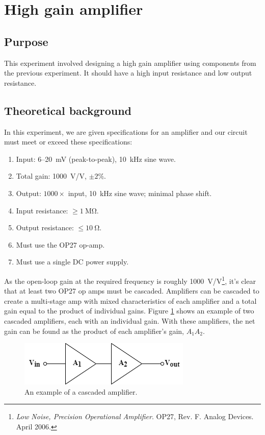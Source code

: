 \documentclass{report}
\begin{document}
	
	\pagebreak
	
	\section{High gain amplifier}
	
	\subsection{Purpose}
	This experiment involved designing a high gain amplifier using components from the previous experiment. It should have a high input resistance and low output resistance.
	
	\subsection{Theoretical background}
	In this experiment, we are given specifications for an amplifier and our circuit must meet or exceed these specifications:
	\begin{enumerate}
		\item Input: \num{6}--\SI{20}{\milli\volt} (peak-to-peak), \SI{10}{\kHz} sine wave.
		\item Total gain: \SI{1000}{\V/\V}, $\pm 2\%$.
		\item Output: $1000 \times $ input, \SI{10}{\kHz} sine wave; minimal phase shift.
		\item Input resistance: $\ge \SI{1}{\Mohm}$.
		\item Output resistance: $\le \SI{10}{\ohm}$.
		\item Must use the OP27 op-amp.
		\item Must use a single DC power supply.
	\end{enumerate}
	As the open-loop gain at the required frequency is roughly \SI{1000}{\V/\V}\footnote{\textit{Low Noise, Precision Operational Amplifier}. OP27, Rev. F. Analog Devices. April 2006.}, it's clear that at least two OP27 op amps must be cascaded. Amplifiers can be cascaded to create a multi-stage amp with mixed characteristics of each amplifier and a total gain equal to the product of individual gains. Figure \ref{fig:cascaded} shows an example of two cascaded amplifiers, each with an individual gain. With these amplifiers, the net gain can be found as the product of each amplifier's gain, $A_1 A_2$.
	\begin{figure}[h]
		\centering
		\includegraphics[width=0.4\linewidth]{cascaded}
		\caption{An example of a cascaded amplifier.}
		\label{fig:cascaded}
	\end{figure}
	
\end{document}

